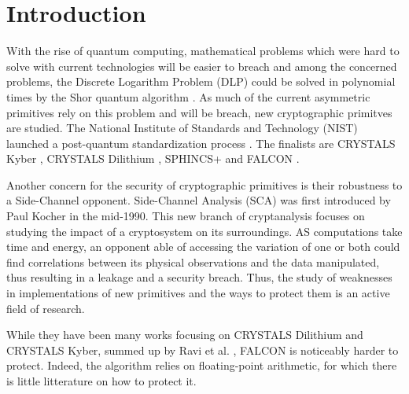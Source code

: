 \documentclass[runningheads]{llncs}
\begin{document}
\section{Introduction}
With the rise of quantum computing, mathematical problems which were
hard to solve with current technologies will be easier to breach and
among the concerned problems, the Discrete Logarithm Problem (DLP)
could be solved in polynomial times by the Shor quantum algorithm
\cite{doi:10.1137/S0036144598347011}. As much of the current
asymmetric primitives rely on this problem and will be breach, new
cryptographic primitves are studied. The National Institute of
Standards and Technology (NIST) launched a post-quantum
standardization process \cite{chen2016report}. The finalists are
CRYSTALS Kyber \cite{8406610,nistfips203mlkem}, CRYSTALS Dilithium
\cite{Ducas_Kiltz_Lepoint_Lyubashevsky_Schwabe_Seiler_Stehlé_2018,nistfips204mldsa},
SPHINCS+ \cite{10.1145/3319535.3363229,nistfips205shdsa} and FALCON
\cite{prest2020falcon}.

\medskip

\noindent Another concern for the security of cryptographic primitives
is their robustness to a Side-Channel opponent. Side-Channel Analysis
(SCA) was first introduced by Paul Kocher
\cite{10.1007/3-540-68697-5_9} in the mid-1990. This new branch of
cryptanalysis focuses on studying the impact of a cryptosystem on its
surroundings. AS computations take time and energy, an opponent able
of accessing the variation of one or both could find correlations
between its physical observations and the data manipulated, thus
resulting in a leakage and a security breach. Thus, the study of
weaknesses in implementations of new primitives and the ways to
protect them is an active field of research.

\medskip 

\noindent While they have been many works focusing on CRYSTALS
Dilithium and CRYSTALS Kyber, summed up by Ravi et
al. \cite{10.1145/3603170}, FALCON is noticeably harder to
protect. Indeed, the algorithm relies on floating-point arithmetic,
for which there is little litterature on how to protect it.
%
\end{document}
